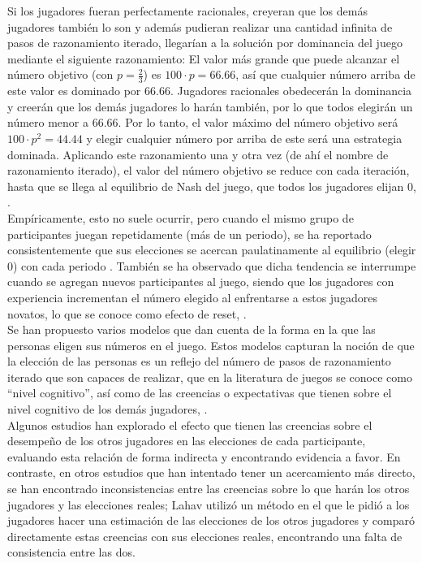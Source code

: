 Si los jugadores fueran perfectamente racionales, creyeran que los demás jugadores también lo son y además pudieran realizar una cantidad infinita de pasos de razonamiento iterado, llegarían a la solución por dominancia del juego mediante el siguiente razonamiento: El valor más grande que puede alcanzar el número objetivo (con $p = \frac{2}{3}$) es $100 \cdot p=66.66$, así que cualquier número arriba de este valor es dominado por $66.66$. Jugadores racionales obedecerán la dominancia y creerán que los demás jugadores lo harán también, por lo que todos elegirán un número menor a $66.66$. Por lo tanto, el valor máximo del número objetivo será $100 \cdot p^2 = 44.44$ y elegir cualquier número por arriba de este será una estrategia dominada. Aplicando este razonamiento una y otra vez (de ahí el nombre de razonamiento iterado), el valor del número objetivo se reduce con cada iteración, hasta que se llega al equilibrio de Nash del juego, que todos los jugadores elijan $0$, \parencite{Nagel1995, Ho1998}.\\

Empíricamente, esto no suele ocurrir, pero cuando el mismo grupo de participantes juegan repetidamente (más de un periodo), se ha reportado consistentemente que sus elecciones se acercan paulatinamente al equilibrio (elegir $0$) con cada periodo \parencite{Nagel1995, Ho1998}. También se ha observado que dicha tendencia se interrumpe cuando se agregan nuevos participantes al juego, siendo que los jugadores con experiencia incrementan el número elegido al enfrentarse a estos jugadores novatos, lo que se conoce como efecto de reset, \parencite{Slonim2005}.\\

Se han propuesto varios modelos que dan cuenta de la forma en la que las personas eligen sus números en el juego. Estos modelos capturan la noción de que la elección de las personas es un reflejo del número de pasos de razonamiento iterado que son capaces de realizar, que en la literatura de juegos se conoce como “nivel cognitivo”, así como de las creencias o expectativas que tienen sobre el nivel cognitivo de los demás jugadores, \parencite{Crawford2013}.\\

Algunos estudios  han explorado el efecto que tienen las creencias sobre el desempeño de los otros jugadores en las elecciones de cada participante, evaluando esta relación de forma indirecta y encontrando evidencia a favor. En contraste, en otros estudios que han intentado tener un acercamiento más directo, se han encontrado inconsistencias entre las creencias sobre lo que harán los otros jugadores y las elecciones reales; Lahav \parencite*{Lahav2015} utilizó un método en el que le pidió a los jugadores hacer una estimación de las elecciones de los otros jugadores y comparó directamente estas creencias con sus elecciones reales, encontrando una falta de consistencia entre las dos.\\

